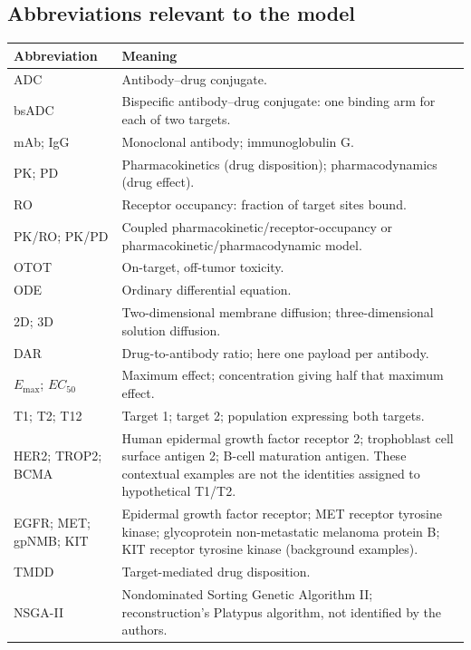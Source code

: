 \documentclass[11pt,a4paper]{article}
\begin{document}
\subsection{Abbreviations relevant to the model}
\begin{longtable}{p{.19\linewidth}p{.75\linewidth}}
\toprule Abbreviation & Meaning\\\midrule\endhead
ADC & Antibody--drug conjugate.\\
bsADC & Bispecific antibody--drug conjugate: one binding arm for each of two targets.\\
mAb; IgG & Monoclonal antibody; immunoglobulin G.\\
PK; PD & Pharmacokinetics (drug disposition); pharmacodynamics (drug effect).\\
RO & Receptor occupancy: fraction of target sites bound.\\
PK/RO; PK/PD & Coupled pharmacokinetic/receptor-occupancy or pharmacokinetic/pharmacodynamic model.\\
OTOT & On-target, off-tumor toxicity.\\
ODE & Ordinary differential equation.\\
2D; 3D & Two-dimensional membrane diffusion; three-dimensional solution diffusion.\\
DAR & Drug-to-antibody ratio; here one payload per antibody.\\
$E_{\max}$; $EC_{50}$ & Maximum effect; concentration giving half that maximum effect.\\
T1; T2; T12 & Target 1; target 2; population expressing both targets.\\
HER2; TROP2; BCMA & Human epidermal growth factor receptor 2; trophoblast cell surface antigen 2; B-cell maturation antigen. These contextual examples are not the identities assigned to hypothetical T1/T2.\\
EGFR; MET; gpNMB; KIT & Epidermal growth factor receptor; MET receptor tyrosine kinase; glycoprotein non-metastatic melanoma protein B; KIT receptor tyrosine kinase (background examples).\\
TMDD & Target-mediated drug disposition.\\
NSGA-II & Nondominated Sorting Genetic Algorithm II; reconstruction's Platypus algorithm, not identified by the authors.\\
\bottomrule
\end{longtable}
\end{document}
